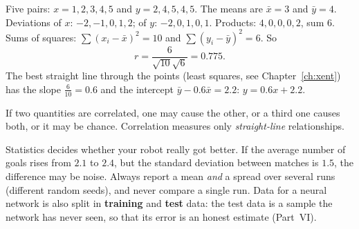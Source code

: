 \begin{example}
Five pairs: $x=1,2,3,4,5$ and $y=2,4,5,4,5$. The means are $\bar x=3$ and $\bar y=4$. Deviations of $x$: $-2,-1,0,1,2$; of $y$: $-2,0,1,0,1$. Products: $4,0,0,0,2$, sum $6$. Sums of squares: $\sum(x_i-\bar x)^2=10$ and $\sum(y_i-\bar y)^2=6$. So
\[
r=\frac{6}{\sqrt{10}\sqrt{6}}=0.775.
\]
The best straight line through the points (least squares, see Chapter~\ref{ch:xent}) has the slope $\frac{6}{10}=0.6$ and the intercept $\bar y-0.6\bar x=2.2$: $y=0.6x+2.2$.
\end{example}

\begin{center}
\label{fig:pr5_corr}
\end{center}

\begin{keyidea}
If two quantities are correlated, one may cause the other, or a third one causes both, or it may be chance. Correlation measures only \emph{straight-line} relationships.
\end{keyidea}

\begin{aibox}
Statistics decides whether your robot really got better. If the average number of goals rises from $2.1$ to $2.4$, but the standard deviation between matches is $1.5$, the difference may be noise. Always report a mean \emph{and} a spread over several runs (different random seeds), and never compare a single run. Data for a neural network is also split in \textbf{training} and \textbf{test} data: the test data is a sample the network has never seen, so that its error is an honest estimate (Part~VI).
\end{aibox}

